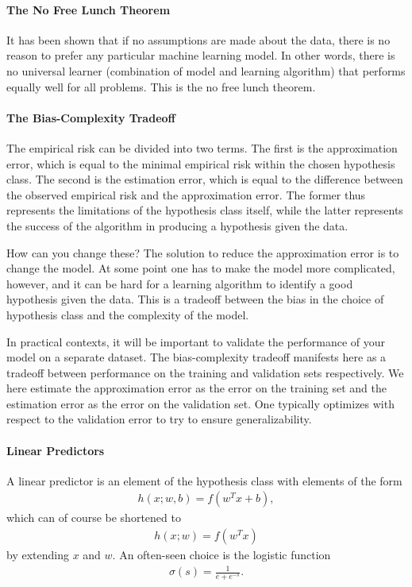 \paragraph{The No Free Lunch Theorem}
It has been shown that if no assumptions are made about the data, there is no reason to prefer any particular machine learning model. In other words, there is no universal learner (combination of model and learning algorithm) that performs equally well for all problems. This is the no free lunch theorem.

\paragraph{The Bias-Complexity Tradeoff}
The empirical risk can be divided into two terms. The first is the approximation error, which is equal to the minimal empirical risk within the chosen hypothesis class. The second is the estimation error, which is equal to the difference between the observed empirical risk and the approximation error. The former thus represents the limitations of the hypothesis class itself, while the latter represents the success of the algorithm in producing a hypothesis given the data.

How can you change these? The solution to reduce the approximation error is to change the model. At some point one has to make the model more complicated, however, and it can be hard for a learning algorithm to identify a good hypothesis given the data. This is a tradeoff between the bias in the choice of hypothesis class and the complexity of the model.

In practical contexts, it will be important to validate the performance of your model on a separate dataset. The bias-complexity tradeoff manifests here as a tradeoff between performance on the training and validation sets respectively. We here estimate the approximation error as the error on the training set and the estimation error as the error on the validation set. One typically optimizes with respect to the validation error to try to ensure generalizability.

\paragraph{Linear Predictors}
A linear predictor is an element of the hypothesis class with elements of the form
\begin{align*}
	h(x; w, b) = f(w^{T}x + b),
\end{align*}
which can of course be shortened to
\begin{align*}
	h(x; w) = f(w^{T}x)
\end{align*}
by extending $x$ and $w$. An often-seen choice is the logistic function
\begin{align*}
	\sigma(s) = \frac{1}{e + e^{-s}}.
\end{align*}

